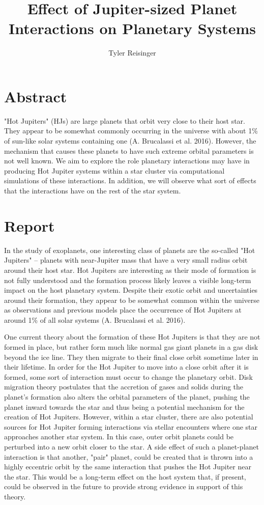\documentclass[12pt]{article}
\author{Tyler Reisinger}
\title{Effect of Jupiter-sized Planet Interactions on Planetary Systems}
\date{}
\begin{document}
\maketitle

\section*{Abstract}

"Hot Jupiters" (HJs) are large planets that orbit very close to their host star. 
They appear to be somewhat commonly occurring in the universe with about 1\% 
of sun-like solar systems containing one (A. Brucalassi et al. 2016). However, the mechanism that causes these planets to have such extreme orbital parameters
is not well known. We aim to explore the role planetary interactions may have in producing Hot 
Jupiter systems within a star cluster via computational simulations of these interactions.
In addition, we will observe what sort of effects that the interactions have on the rest of the star system.

\section*{Report}

In the study of exoplanets, one interesting class of planets are the so-called "Hot Jupiters" -- planets with near-Jupiter mass that have a 
very small radius orbit around their host star. Hot Jupiters are interesting as their mode of formation is not fully understood and the formation process likely leaves
a visible long-term impact on the host planetary system. 
Despite their exotic orbit and uncertainties around their formation, 
they appear to be somewhat common within the universe as observations and previous models place the occurrence of Hot Jupiters at around 1\% of all solar systems (A. Brucalassi et al. 2016).  

One current theory about the formation of these Hot Jupiters is that they are not formed in place, but rather form much like normal gas giant planets 
in a gas disk beyond the ice line. They then migrate to their final close orbit sometime later in their lifetime. 
In order for the Hot Jupiter to move into a close orbit after it is formed, some sort of interaction must occur to change the planetary orbit. 
Disk migration theory postulates that the accretion of gases and solids during the planet's formation also alters the orbital parameters of the planet,
pushing the planet inward towards the star and thus being a potential mechanism for the creation of Hot Jupiters. However, within a star cluster, 
there are also potential sources for Hot Jupiter forming interactions via stellar encounters where one star approaches another star system. In this
case, outer orbit planets could be perturbed into a new orbit closer to the star. 
A side effect of such a planet-planet interaction is that another, "pair" planet, could be created that is 
thrown into a highly eccentric orbit by the same interaction that pushes the Hot Jupiter near the star. This would be a long-term effect on the host system that, if present, 
could be observed in the future to provide strong evidence in support of this theory. 
\end{document}

